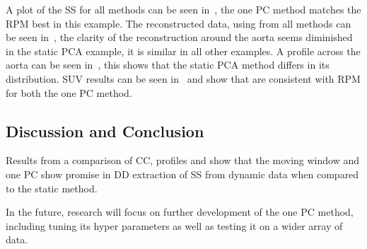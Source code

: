             A plot of the \gls{SS} for all methods can be seen in~, the one \gls{PC} method matches the \gls{RPM} best in this example. The reconstructed data, using  from all methods can be seen in~, the clarity of the reconstruction around the aorta seems diminished in the static \gls{PCA} example, it is similar in all other examples. A profile across the aorta can be seen in~, this shows that the static \gls{PCA} method differs in its distribution. \gls{SUV} results can be seen in~ and show that  are consistent with \gls{RPM} for both the one \gls{PC} method.
            
        \subsection{Discussion and Conclusion} \label{sec:pca_data_driven_surrogate_signal_extraction_methods_for_Dynamic_pet_discussion_and_conclusion}
            Results from a comparison of \gls{CC}, profiles and  show that the moving window and one \gls{PC} show promise in \gls{DD} extraction of \gls{SS} from dynamic data when compared to the static method.
            
            In the future, research will focus on further development of the one \gls{PC} method, including tuning its hyper parameters as well as testing it on a wider array of data.
    
        
        
            
        
            
